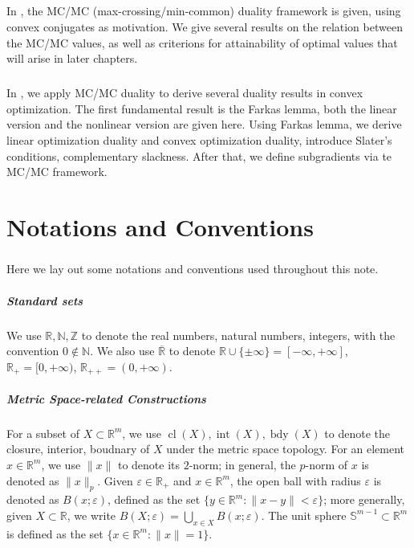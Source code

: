 \paragraph{}In , the MC/MC (max-crossing/min-common) duality framework is given, using convex conjugates as motivation. We give several results on the relation between the MC/MC values, as well as criterions for attainability of optimal values that will arise in later chapters.

\paragraph{}In , we apply MC/MC duality to derive several duality results in convex optimization. The first fundamental result is the Farkas lemma, both the linear version and the nonlinear version are given here. Using Farkas lemma, we derive linear optimization duality and convex optimization duality, introduce Slater's conditions, complementary slackness. After that, we define subgradients via te MC/MC framework.

\chapter*{Notations and Conventions}

\paragraph{}Here we lay out some notations and conventions used throughout this note.

\paragraph{Standard sets}We use $\mathbb{R,N,Z}$ to denote the real numbers, natural numbers, integers, with the convention $0\notin \mathbb{N}$. We also use $\overline{\mathbb{R}}$ to denote $\mathbb{R}\cup\{\pm\infty\}=[-\infty,+\infty]$, $\mathbb{R}_{+}=[0,+\infty)$, $\mathbb{R}_{++}=(0,+\infty)$.

\paragraph{Metric Space-related Constructions}For a subset of $X\subset \mathbb{R}^m$, we use $\operatorname{cl}(X),\operatorname{int}(X),\operatorname{bdy}(X)$ to denote the closure, interior, boudnary of $X$ under the metric space topology. For an element $x\in \mathbb{R}^m$, we use $\|x\|$ to denote its $2$-norm; in general, the $p$-norm of $x$ is denoted as $\|x\|_p$. Given $\varepsilon \in \mathbb{R}_{+}$ and $x\in \mathbb{R}^m$, the open ball with radius $\varepsilon$ is denoted as $B(x;\varepsilon )$, defined as the set $\{y\in \mathbb{R}^m:\|x-y\|<\varepsilon \}$; more generally, given $X\subset \mathbb{R}$, we write $B(X;\varepsilon )=\bigcup_{x\in X}B(x;\varepsilon )$. The unit sphere $\mathbb{S}^{m-1}\subset \mathbb{R}^m$ is defined as the set $\{x\in \mathbb{R}^m:\|x\|=1\}$.


